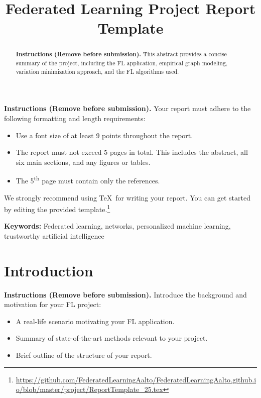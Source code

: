 \documentclass[9pt]{article}
\title{Federated Learning Project Report Template}
\begin{document}
	\maketitle
	
\noindent\textbf{Instructions (Remove before submission).}
	Your report must adhere to the following formatting and length requirements:
	\begin{itemize}
		\item Use a font size of at least 9 points throughout the report.
		\item The report must not exceed 5 pages in total. This includes the abstract, all six main sections, and any figures or tables.
		\item The 5\textsuperscript{th} page must contain only the references.
	\end{itemize}
	We strongly recommend using \TeX\ for writing your report. You can get 
	started by editing the provided template.\footnote{ \url{https://github.com/FederatedLearningAalto/FederatedLearningAalto.github.io/blob/master/project/ReportTemplate_25.tex}}
	
	

	\begin{abstract}
		{\bf Instructions (Remove before submission).} This abstract provides a concise summary of the project, including the FL 
		application, empirical graph modeling, variation minimization approach, and 
		the FL algorithms used.
	\end{abstract}
	
	\textbf{Keywords:} Federated learning, networks, personalized machine learning, trustworthy artificial intelligence
	
	\section{Introduction}
	\label{sec:intro}
	{\bf Instructions (Remove before submission).}
		Introduce the background and motivation for your FL project:
		\begin{itemize}
			\item A real-life scenario motivating your FL application.
			\item Summary of state-of-the-art methods relevant to your project.
			\item Brief outline of the structure of your report.
		\end{itemize}
	
\end{document}
